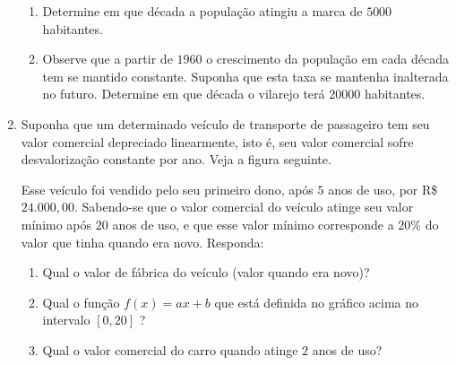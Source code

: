 \begin{enumerate}
\begin{figure}[H]
\end{figure}
\begin{enumerate}
\item {} 
Determine em que década a população atingiu a marca de \(5 000\) habitantes.

\item {} 
Observe que a partir de \(1960\) o crescimento da população em cada década tem se mantido constante. Suponha que esta taxa se mantenha inalterada no futuro. Determine em que década o vilarejo terá \(20 000\) habitantes.

\end{enumerate}

\item Suponha que um determinado veículo de transporte de passageiro tem seu valor comercial depreciado linearmente, isto é, seu valor comercial sofre desvalorização constante por ano. Veja a figura seguinte.
\begin{figure}[H]
\centering

\end{figure}

Esse veículo foi vendido pelo seu primeiro dono, após \(5\) anos de uso, por R\$ \(24.000,00\). Sabendo-se que o valor comercial do veículo atinge seu valor mínimo após \(20\) anos de uso, e que esse valor mínimo corresponde a \(20\%\) do valor que tinha quando era novo. Responda:
\begin{enumerate}
\item {} 
Qual o valor de fábrica do veículo (valor quando era novo)?

\item {} 
Qual o função \(f(x)=ax+b\) que está definida no gráfico acima no intervalo \([0,20]\) ?

\item {} 
Qual o valor comercial do carro quando atinge \(2\) anos de uso?

\end{enumerate}


\end{enumerate}

